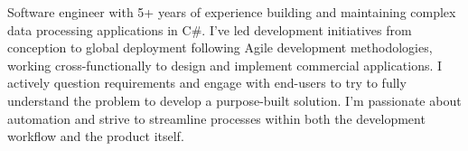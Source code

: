 \begin{justify}
Software engineer with 5+ years of experience building and maintaining complex data processing applications in C\#. I've led development initiatives from conception to global deployment following Agile development methodologies, working cross-functionally to design and implement commercial applications. I actively question requirements and engage with end-users to try to fully understand the problem to develop a purpose-built solution. I'm passionate about automation and strive to streamline processes within both the development workflow and the product itself.
\end{justify}